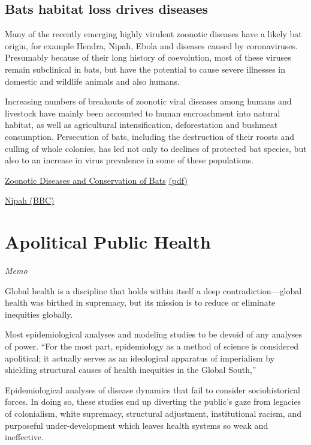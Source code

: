 \documentclass[
]{book}
\begin{document}
\hypertarget{bats-habitat-loss-drives-diseases}{%
\subsection{Bats habitat loss drives diseases}\label{bats-habitat-loss-drives-diseases}}

Many of the recently emerging highly virulent zoonotic diseases have a
likely bat origin, for example Hendra, Nipah, Ebola and diseases caused
by coronaviruses.
Presumably because of their long history of coevolution, most of these
viruses remain subclinical in bats,
but have the potential to cause severe illnesses
in domestic and wildlife animals and also humans.

Increasing numbers of breakouts of zoonotic viral diseases among
humans and livestock have mainly been accounted to human encroachment
into natural habitat, as well as agricultural intensification,
deforestation and bushmeat consumption.
Persecution of bats, including the destruction of their roosts and culling of
whole colonies, has led not only to declines of protected bat species,
but also to an increase in virus prevalence in some of these populations.

\href{https://www.researchgate.net/publication/286449572\%20_Zoonotic_Viruses_and_Conservation_of_Bats}{Zoonotic Diseases and Conservation of Bats}
\href{/pdf/Schneeberger_Voigt_2016_Bats_Zoonotic.pdf}{(pdf)}

\href{https://www.bbc.com/future/article/20210106-nipah-virus-how-bats-could-cause-the-\%20next-pandemic}{Nipah (BBC)}

\hypertarget{apolitical-public-health}{%
\section{Apolitical Public Health}\label{apolitical-public-health}}

\emph{Memo}

Global health is a discipline that holds within itself a deep contradiction---global health was birthed in supremacy, but its mission is to reduce or eliminate inequities globally.

Most epidemiological analyses and modeling studies to be devoid of any analyses of power. ``For the most part, epidemiology as a method of science is considered apolitical; it actually serves as an ideological apparatus of imperialism by shielding structural causes of health inequities in the Global South,''

Epidemiological analyses of disease dynamics that fail to consider sociohistorical forces. In doing so, these studies end up diverting the public's gaze from legacies of colonialism, white supremacy, structural adjustment, institutional racism, and purposeful under-development which leaves health systems so weak and ineffective.
\end{document}
